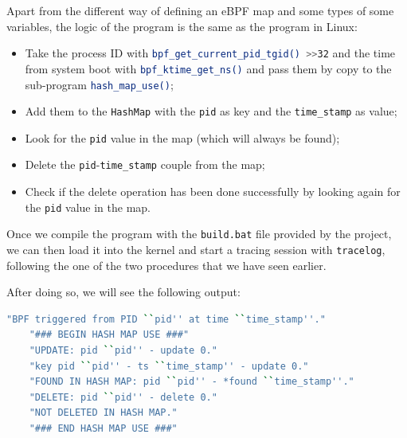 Apart from the different way of defining an eBPF map and some types of some variables, the logic of the program is the same as the program in Linux: 

\begin{itemize}
	\item 
		Take the process ID with \colorbox{backcolour}{\lstinline[style=commandline, language=bash, breaklines=true]|bpf_get_current_pid_tgid() >>32|} and the time from system boot with \colorbox{backcolour}{\lstinline[style=commandline, language=bash, breaklines=true]|bpf_ktime_get_ns()|} and pass them by copy to the sub-program \colorbox{backcolour}{\lstinline[style=commandline, language=bash, breaklines=true]|hash_map_use()|};
	\item 
		Add them to the \colorbox{backcolour}{\lstinline[style=commandline, language=bash, breaklines=true]|HashMap|} with the \colorbox{backcolour}{\lstinline[style=commandline, language=bash, breaklines=true]|pid|} as key and the \colorbox{backcolour}{\lstinline[style=commandline, language=bash, breaklines=true]|time_stamp|} as value;
	\item 
		Look for the \colorbox{backcolour}{\lstinline[style=commandline, language=bash, breaklines=true]|pid|} value in the map (which will always be found);
	\item 
		Delete the \colorbox{backcolour}{\lstinline[style=commandline, language=bash, breaklines=true]|pid|}-\colorbox{backcolour}{\lstinline[style=commandline, language=bash, breaklines=true]|time_stamp|} couple from the map;
	\item 
		Check if the delete operation has been done successfully by looking again for the \colorbox{backcolour}{\lstinline[style=commandline, language=bash, breaklines=true]|pid|} value in the map.
\end{itemize}

Once we compile the program with the \colorbox{backcolour}{\lstinline[style=commandline, language=bash, breaklines=true]|build.bat|} file provided by the project, we can then load it into the kernel and start a tracing session with \colorbox{backcolour}{\lstinline[style=commandline, language=bash, breaklines=true]|tracelog|}, following the one of the two procedures that we have seen earlier.

After doing so, we will see the following output:

\begin{lstlisting}[style=commandline, language=bash, caption={Debug messages of the program that uses a map in windows-ebpf-starter.}]
	"BPF triggered from PID ``pid'' at time ``time_stamp''."
	"### BEGIN HASH MAP USE ###"
	"UPDATE: pid ``pid'' - update 0."
	"key pid ``pid'' - ts ``time_stamp'' - update 0."
	"FOUND IN HASH MAP: pid ``pid'' - *found ``time_stamp''."
	"DELETE: pid ``pid'' - delete 0."
	"NOT DELETED IN HASH MAP."
	"### END HASH MAP USE ###"
\end{lstlisting}

